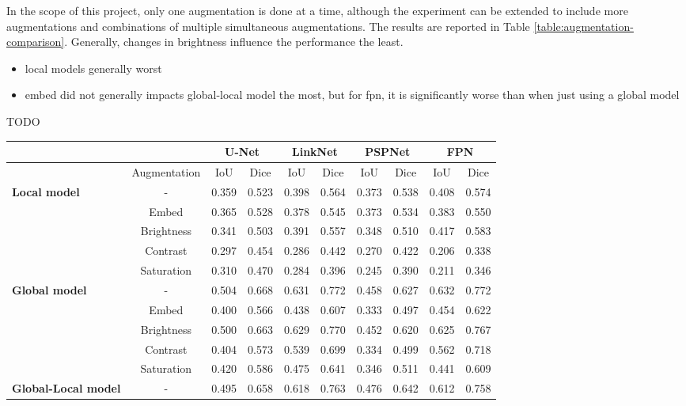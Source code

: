 In the scope of this project, only one augmentation is done at a time, although the experiment can be extended to include more augmentations and combinations of multiple simultaneous augmentations. The results are reported in Table \ref{table:augmentation-comparison}. Generally, changes in brightness influence the performance the least. 

\begin{itemize}
	\item local models generally worst
	\item embed did not generally impacts global-local model the most, but for fpn, it is significantly worse than when just using a global model
\end{itemize}
TODO

\begin{table}[htb!]
	\centering
	\begin{tabular}{l | c ||c | c || c | c || c | c || c | c||}
	& & \multicolumn{2}{|c||}{U-Net} & \multicolumn{2}{|c||}{LinkNet} & \multicolumn{2}{|c||}{PSPNet} & \multicolumn{2}{|c||}{FPN} \\
	\hline
	& Augmentation & IoU & Dice & IoU & Dice & IoU & Dice & IoU & Dice \\
	\hline\hline
	\multirow{5}{*}{\textbf{Local model}} & - & 0.359 & 0.523 & 0.398 & 0.564 & 0.373 & 0.538 & 0.408 & 0.574 \\
	& Embed & 0.365 & 0.528 & 0.378 & 0.545 & 0.373 & 0.534 & 0.383 & 0.550\\
	& Brightness & 0.341 & 0.503 & 0.391 & 0.557 & 0.348 & 0.510 & 0.417 & 0.583\\
	& Contrast & 0.297 & 0.454 & 0.286 & 0.442 & 0.270 & 0.422 & 0.206 & 0.338\\
	& Saturation & 0.310 & 0.470 & 0.284 & 0.396 & 0.245 & 0.390 & 0.211 & 0.346\\
	\hline
	\multirow{5}{*}{\textbf{Global model}} & - & 0.504 & 0.668 & 0.631 & 0.772 & 0.458 & 0.627 & 0.632 & 0.772 \\
	& Embed & 0.400 & 0.566 & 0.438 & 0.607 & 0.333 & 0.497 & 0.454 & 0.622\\
	& Brightness & 0.500 & 0.663 & 0.629 & 0.770 & 0.452 & 0.620 & 0.625 & 0.767\\
	& Contrast & 0.404 & 0.573 & 0.539 & 0.699 & 0.334 & 0.499 & 0.562 & 0.718\\
	& Saturation & 0.420 & 0.586 & 0.475 & 0.641 & 0.346 & 0.511 & 0.441 & 0.609\\
	\hline
	\multirow{5}{*}{\textbf{Global-Local model}} & - & 0.495 & 0.658 & 0.618 & 0.763 & 0.476 & 0.642 & 0.612 & 0.758\\

\end{tabular}
\end{table}
